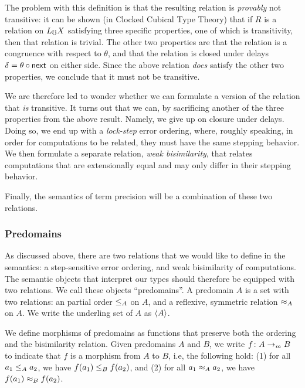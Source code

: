 The problem with this definition is that the resulting relation is \emph{provably} not
transitive: it can be shown (in Clocked Cubical Type Theory) that if $R$ is a
relation on $L_\mho X$ satisfying three specific properties, one of which is
transitivity, then that relation is trivial.
The other two properties are that the relation is a congruence with respect to $\theta$,
and that the relation is closed under delays $\delta = \theta \circ \mathsf{next}$ on either side.
Since the above relation \emph{does} satisfy the other two properties, we conclude
that it must not be transitive.


We are therefore led to wonder whether we can formulate a version of the relation
that \emph{is} transitive.
It turns out that we can, by sacrificing another of the three properties from
the above result. Namely, we give up on closure under delays. Doing so, we end up
with a \emph{lock-step} error ordering, where, roughly speaking, in order for
computations to be related, they must have the same stepping behavior.
%
We then formulate a separate relation, \emph{weak bisimilarity}, that relates computations
that are extensionally equal and may only differ in their stepping behavior.

Finally, the semantics of term precision will be a combination of these two relations.



\subsubsection{Predomains}\label{sec:predomains}

As discussed above, there are two relations that we would like to define
in the semantics: a step-sensitive error ordering, and weak bisimilarity of computations.
%
The semantic objects that interpret our types should therefore be equipped with
two relations. We call these objects ``predomains''.
A predomain $A$ is a set with two relations: an partial order $\le_A$ on $A$, and
a reflexive, symmetric relation $\approx_A$ on $A$.
We write the underling set of $A$ as $\langle {A} \rangle$.

We define morphisms of predomains as functions that preserve both
the ordering and the bisimilarity relation. Given predomains
$A$ and $B$, we write $f \colon A \to_m B$ to indicate that $f$ is a morphism
from $A$ to $B$, i.e, the following hold:
(1) for all $a_1 \le_A a_2$, we have $f(a_1) \le_{B} f(a_2)$, and
(2) for all $a_1 \approx_A a_2$, we have $f(a_1) \approx_{B} f(a_2)$.


